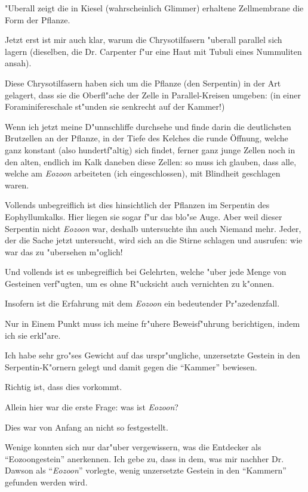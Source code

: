 \documentclass[a4paper, 11pt, oneside, german]{article}
\begin{document}
"Uberall zeigt die in Kiesel (wahrscheinlich Glimmer) erhaltene Zellmembrane die Form der Pflanze.

Jetzt erst ist mir auch klar, warum die Chrysotilfasern "uberall parallel sich lagern (dieselben, die Dr. Carpenter f"ur eine Haut mit Tubuli eines Nummuliten ansah).

Diese Chrysotilfasern haben sich um die Pflanze (den Serpentin) in der Art gelagert, dass sie die Oberfl"ache der Zelle in Parallel-Kreisen umgeben: (in einer Foraminifereschale st"unden sie senkrecht auf der Kammer!)

Wenn ich jetzt meine D"unnschliffe durchsehe und finde darin die deutlichsten Brutzellen an der Pflanze, in der Tiefe des Kelches die runde Öffnung, welche ganz konstant (also hundertf"altig) sich findet, ferner ganz junge Zellen noch in den alten, endlich im Kalk daneben diese Zellen: so muss ich glauben, dass alle, welche am \emph{Eozoon} arbeiteten (ich eingeschlossen), mit Blindheit geschlagen waren.

Vollends unbegreiflich ist dies hinsichtlich der Pflanzen im Serpentin des Eophyllumkalks. Hier liegen sie sogar f"ur das blo"se Auge. Aber weil dieser Serpentin nicht \emph{Eozoon} war, deshalb untersuchte ihn auch Niemand mehr. Jeder, der die Sache jetzt untersucht, wird sich an die Stirne schlagen und ausrufen: wie war das zu "ubersehen m"oglich!

Und vollends ist es unbegreiflich bei Gelehrten, welche "uber jede Menge von Gesteinen verf"ugten, um es ohne R"ucksicht auch vernichten zu k"onnen.

Insofern ist die Erfahrung mit dem \emph{Eozoon} ein bedeutender Pr"azedenzfall.

Nur in Einem Punkt muss ich meine fr"uhere Beweisf"uhrung berichtigen, indem ich sie erkl"are.

Ich habe sehr gro"ses Gewicht auf das urspr"ungliche, unzersetzte Gestein in den Serpentin-K"ornern gelegt und damit gegen die "`Kammer"' bewiesen.

Richtig ist, dass dies vorkommt.

Allein hier war die erste Frage: was ist \emph{Eozoon}?

Dies war von Anfang an nicht so festgestellt.

Wenige konnten sich nur dar"uber vergewissern, was die Entdecker als "`Eozoongestein"' anerkennen. Ich gebe zu, dass in dem, was mir nachher Dr. Dawson als "`\emph{Eozoon}"' vorlegte, wenig unzersetzte Gestein in den "`Kammern"' gefunden werden wird.
\end{document}
